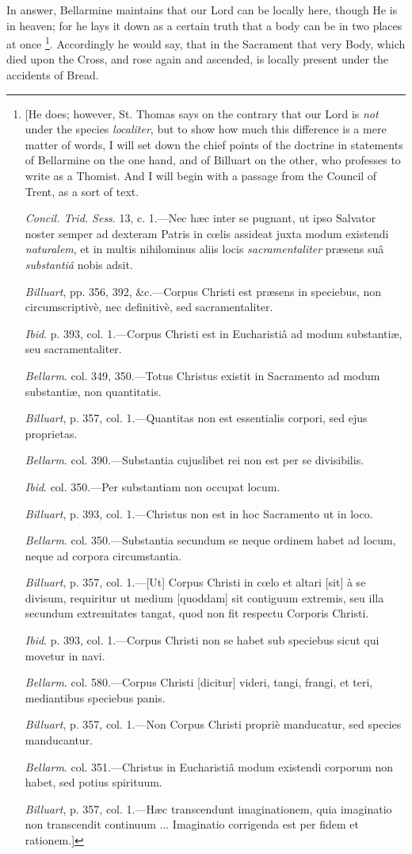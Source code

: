 In answer, Bellarmine maintains that our Lord can
be locally here, though He is in heaven; for he lays it down as a
certain truth that a body can be in two places at once \footnote{[He does; however, St. Thomas says on the contrary that our Lord is \emph{not}
under the species \emph{localiter}, but to show how much this
difference is a mere matter of words, I will set down the chief points
of the doctrine in statements of Bellarmine on the one hand, and of
Billuart on the other, who professes to write as a Thomist. And I will
begin with a passage from the Council of Trent, as a sort of text.

\emph{Concil. Trid. Sess}. 13, c. 1.—Nec hæc
inter se pugnant, ut ipso Salvator noster semper ad dexteram Patris in
cœlis assideat juxta modum existendi \emph{naturalem}, et in multis
nihilominus aliis locis \emph{sacramentaliter} præsens suâ \emph{substantiâ}
nobis adsit.

\emph{Billuart}, pp. 356, 392, \&c.—Corpus
Christi est præsens in speciebus, non circumscriptivè, nec definitivè,
sed sacramentaliter.

\emph{Ibid}. p. 393, col. 1.—Corpus Christi est in Eucharistiâ ad
modum substantiæ, seu sacramentaliter.

\emph{Bellarm}. col. 349, 350.—Totus Christus existit in Sacramento
ad modum substantiæ, non quantitatis.

\emph{Billuart}, p. 357, col. 1.—Quantitas non est essentialis
corpori, sed ejus proprietas.

\emph{Bellarm}. col. 390.—Substantia cujuslibet rei non est per se
divisibilis.

\emph{Ibid}. col. 350.—Per substantiam non occupat locum.

\emph{Billuart}, p. 393, col. 1.—Christus non est in hoc Sacramento
ut in loco.

\emph{Bellarm}. col. 350.—Substantia secundum se neque ordinem habet
ad locum, neque ad corpora circumstantia.

\emph{Billuart}, p. 357, col. 1.—[Ut] Corpus Christi in cœlo et
altari [sit] à se divisum, requiritur ut medium [quoddam] sit
contiguum extremis, seu illa secundum extremitates tangat, quod non
fit respectu Corporis Christi.

\emph{Ibid}. p. 393, col. 1.—Corpus Christi non se habet sub
speciebus sicut qui movetur in navi.

\emph{Bellarm}. col. 580.—Corpus Christi [dicitur] videri, tangi,
frangi, et teri, mediantibus speciebus panis.

\emph{Billuart}, p. 357, col. 1.—Non Corpus Christi propriè
manducatur, sed species manducantur.

\emph{Bellarm}. col. 351.—Christus in Eucharistiâ modum existendi
corporum non habet, sed potius spirituum.

\emph{Billuart}, p. 357, col. 1.—Hæc transcendunt imaginationem,
quia imaginatio non transcendit continuum ... Imaginatio corrigenda
est per fidem et rationem.]}. Accordingly he would say, that in the Sacrament that
very Body, which died upon the Cross, and rose again and ascended, is
locally present under the accidents of Bread.

